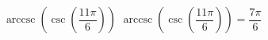  {$\operatorname{arccsc}\left(\csc\left(\dfrac{11\pi}{6}\right) \right)$ }
{ $\operatorname{arccsc}\left(\csc\left(\dfrac{11\pi}{6}\right) \right) = \dfrac{7\pi}{6}$}
